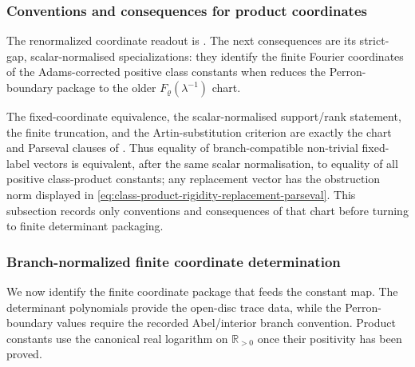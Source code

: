 
\subsubsection{Conventions and consequences for product coordinates}
\label{subsubsec:class-product-local-observation}

The renormalized coordinate readout is
.  The next consequences are its
strict-gap, scalar-normalised specializations: they identify the finite Fourier
coordinates of the Adams-corrected positive class constants when
 reduces the Perron-boundary package to
the older \(F_\varrho(\lambda^{-1})\) chart.

The fixed-coordinate equivalence, the scalar-normalised support/rank statement,
the finite truncation, and the Artin-substitution criterion are exactly the
chart and Parseval clauses of
.
Thus equality of branch-compatible non-trivial fixed-label vectors is
equivalent, after the same scalar normalisation, to equality of all positive
class-product constants; any replacement vector has the obstruction norm
displayed in \eqref{eq:class-product-rigidity-replacement-parseval}.  This
subsection records only conventions and consequences of that chart before
turning to finite determinant packaging.
\subsubsection{Branch-normalized finite coordinate determination}
\label{subsubsec:finite-determinant-closure-classical-comparison}

We now identify the finite coordinate package that feeds the
constant map.  The determinant polynomials provide the open-disc trace data,
while the Perron-boundary values require the recorded Abel/interior branch
convention.  Product constants use the canonical real logarithm on
\(\mathbb R_{>0}\) once their positivity has been proved.

